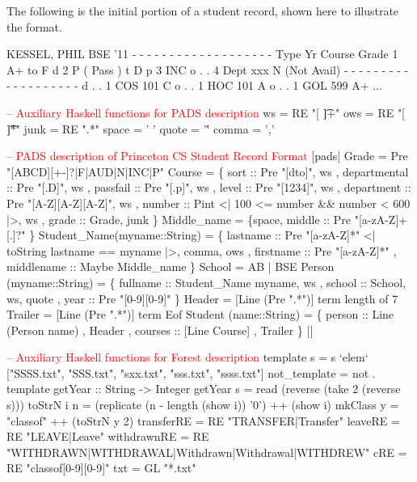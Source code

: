 The following is the initial portion of a student record, shown here
to illustrate the format.
\begin{code}
KESSEL, PHIL	   BSE   '11
- - - - - - - - - - - - - - - - - - -
Type    Yr  Course     Grade
         1             A+ to F
d        2             P  (  Pass )
t  D  p  3             INC
o  .  .  4  Dept  xxx  N  (Not Avail)
- - - - - - - - - - - - - - - - - - -
d  .  .  1  COS   101  C
o  .  .  1  HOC   101  A
o  .  .  1  GOL   599  A+
...
\end{code}

\begin{code}
\textcolor{red}{-- Auxiliary Haskell functions for PADS description}
ws   = RE "[ \t]+"
ows  = RE "[ \t]*"
junk = RE ".*"
space = ' '
quote = '\''
comma = ','
\end{code}

\begin{code}
\textcolor{red}{-- PADS description of Princeton CS Student Record Format}
[pads| 
   Grade = Pre "[ABCD][+-]?|F|AUD|N|INC|P"
\mbox{}
   Course = 
    \{ sort         :: Pre "[dto]",           ws
    , departmental :: Pre "[.D]",            ws
    , passfail     :: Pre "[.p]",            ws
    , level        :: Pre "[1234]",          ws
    , department   :: Pre "[A-Z][A-Z][A-Z]", ws
    , number       :: Pint  <| 100 <= number && number < 600 |>, ws
    , grade        :: Grade,                 junk                               
    \} 
\mbox{}
   Middle_name = \{space, middle :: Pre "[a-zA-Z]+[.]?" \}    
\mbox{} 
   Student_Name(myname::String) = 
    \{ lastname   :: Pre "[a-zA-Z]*"   <| toString lastname ==  myname |>,  comma, ows     
    , firstname  :: Pre "[a-zA-Z]*" 
    , middlename :: Maybe Middle_name
    \}
\mbox{}
   School = AB | BSE
\mbox{}
   Person (myname::String) =
    \{ fullname   :: Student_Name myname,    ws
    , school     :: School,                 ws, quote
    , year       :: Pre "[0-9][0-9]"
    \}
\mbox{}
   Header  = [Line (Pre ".*")]  term length of 7 
   Trailer = [Line (Pre ".*")]  term Eof 
   Student (name::String) = 
    \{ person  :: Line (Person name)
    , Header  
    , courses :: [Line Course]
    , Trailer
    \}
|]
\end{code}

\begin{code}
\textcolor{red}{-- Auxiliary Haskell functions for Forest description}
template s = s `elem` ["SSSS.txt", "SSS.txt", "sxx.txt", "sss.txt", "ssss.txt"]
not_template = not . template
\mbox{}
getYear :: String -> Integer
getYear s = read (reverse (take 2 (reverse s)))
toStrN i n = (replicate  (n - length (show i)) '0') ++ (show i)
mkClass y = "classof" ++ (toStrN y 2)
\mbox{}
transferRE  = RE "TRANSFER|Transfer"
leaveRE     = RE "LEAVE|Leave"
withdrawnRE = RE "WITHDRAWN|WITHDRAWAL|Withdrawn|Withdrawal|WITHDREW"
cRE         = RE "classof[0-9][0-9]" 
txt         = GL "*.txt"
\end{code}


